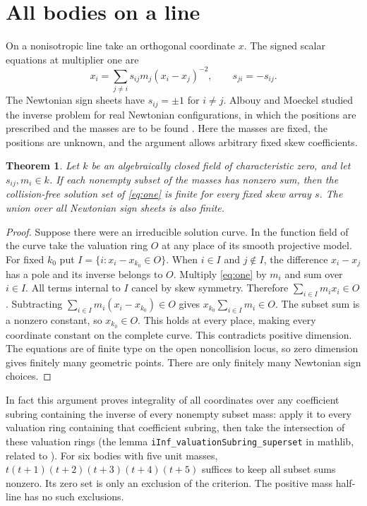 \documentclass[11pt]{article}
\newtheorem{theorem}{Theorem}\newtheorem{corollary}[theorem]{Corollary}\newtheorem{lemma}[theorem]{Lemma}
\begin{document}
\section{All bodies on a line}
On a nonisotropic line take an orthogonal coordinate $x$. The signed scalar equations at multiplier one are
\begin{equation}\label{eq:one}
 x_i=\sum_{j\ne i} s_{ij}m_j(x_i-x_j)^{-2},\qquad s_{ji}=-s_{ij}.
\end{equation}
The Newtonian sign sheets have $s_{ij}=\pm1$ for $i\ne j$. Albouy and Moeckel studied the inverse problem for real Newtonian configurations, in which the positions are prescribed and the masses are to be found \cite{am}. Here the masses are fixed, the positions are unknown, and the argument allows arbitrary fixed skew coefficients.
\begin{theorem}\label{th:val}
Let $k$ be an algebraically closed field of characteristic zero, and let $s_{ij},m_i\in k$. If each nonempty subset of the masses has nonzero sum, then the collision-free solution set of \eqref{eq:one} is finite for every fixed skew array $s$. The union over all Newtonian sign sheets is also finite.
\end{theorem}
\begin{proof}
Suppose there were an irreducible solution curve. In the function field of the curve take the valuation ring $O$ at any place of its smooth projective model. For fixed $k_0$ put $I=\{i:x_i-x_{k_0}\in O\}$. When $i\in I$ and $j\notin I$, the difference $x_i-x_j$ has a pole and its inverse belongs to $O$. Multiply \eqref{eq:one} by $m_i$ and sum over $i\in I$. All terms internal to $I$ cancel by skew symmetry. Therefore $\sum_{i\in I}m_i x_i\in O$. Subtracting $\sum_{i\in I}m_i(x_i-x_{k_0})\in O$ gives $x_{k_0}\sum_{i\in I}m_i\in O$. The subset sum is a nonzero constant, so $x_{k_0}\in O$. This holds at every place, making every coordinate constant on the complete curve. This contradicts positive dimension. The equations are of finite type on the open noncollision locus, so zero dimension gives finitely many geometric points. There are only finitely many Newtonian sign choices.
\end{proof}
In fact this argument proves integrality of all coordinates over any coefficient subring containing the inverse of every nonempty subset mass: apply it to every valuation ring containing that coefficient subring, then take the intersection of these valuation rings (the lemma \nolinkurl{iInf_valuationSubring_superset} in mathlib, related to \cite{stacks}). For six bodies with five unit masses, $t(t+1)(t+2)(t+3)(t+4)(t+5)$ suffices to keep all subset sums nonzero. Its zero set is only an exclusion of the criterion. The positive mass half-line has no such exclusions.
\end{document}
